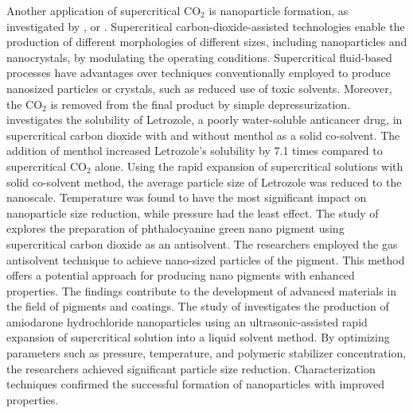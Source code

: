 \documentclass[a4paper,fleqn]{cas-dc}
\begin{document}
	Another application of supercritical CO$_2$ is nanoparticle formation, as investigated by \citet{Padrela2018}, \citet{Franco2021} or \citet{Sodeifian2022}. Supercritical carbon-dioxide-assisted technologies enable the production of different morphologies of different sizes, including nanoparticles and nanocrystals, by modulating the operating conditions. Supercritical fluid-based processes have advantages over techniques conventionally employed to produce nanosized particles or crystals, such as reduced use of toxic solvents. Moreover, the CO$_2$ is removed from the final product by simple depressurization. 
	{\color{blue} \citet{Sodeifian2018} investigates the solubility of Letrozole, a poorly water-soluble anticancer drug, in supercritical carbon dioxide with and without menthol as a solid co-solvent. The addition of menthol increased Letrozole's solubility by 7.1 times compared to supercritical CO$_2$ alone. Using the rapid expansion of supercritical solutions with solid co-solvent method, the average particle size of Letrozole was reduced to the nanoscale. Temperature was found to have the most significant impact on nanoparticle size reduction, while pressure had the least effect. 
	The study of \citet{SaadatiArdestani2020} explores the preparation of phthalocyanine green nano pigment using supercritical carbon dioxide as an antisolvent. The researchers employed the gas antisolvent technique to achieve nano-sized particles of the pigment. This method offers a potential approach for producing nano pigments with enhanced properties. The findings contribute to the development of advanced materials in the field of pigments and coatings.
	The study of \citet{Sodeifian2019} investigates the production of amiodarone hydrochloride nanoparticles using an ultrasonic-assisted rapid expansion of supercritical solution into a liquid solvent method. By optimizing parameters such as pressure, temperature, and polymeric stabilizer concentration, the researchers achieved significant particle size reduction. Characterization techniques confirmed the successful formation of nanoparticles with improved properties.
	}
	
\end{document}
